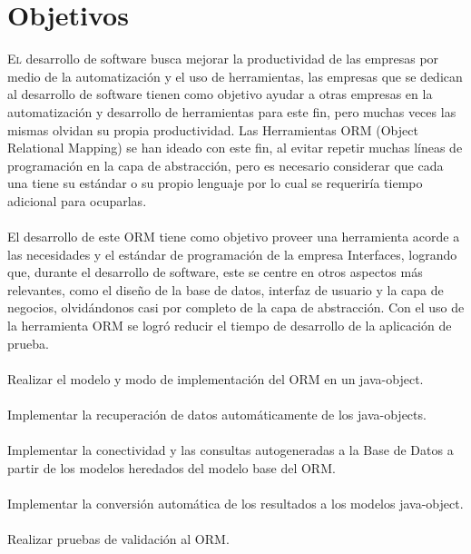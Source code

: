 \documentclass[twoside,twocolumn]{article}
\begin{document}
\section{Objetivos}
\begin{flushright}
\begin{itemize}
\lettrine[nindent=0em,lines=3]{E}l desarrollo de software busca mejorar la productividad de las empresas por medio de la automatización y el uso de herramientas, las empresas que se dedican al desarrollo de software tienen como objetivo ayudar a otras empresas en la automatización y desarrollo de herramientas para este fin, pero muchas veces las mismas olvidan su propia productividad. Las Herramientas ORM (Object  Relational  Mapping) se han ideado con este fin, al evitar repetir muchas líneas de programación en la capa de abstracción, pero es necesario considerar que cada una tiene su estándar o su propio lenguaje por lo cual se requeriría tiempo adicional para ocuparlas. \textbf{}\\
\textbf{}\\
El desarrollo de este ORM tiene como objetivo proveer una herramienta acorde a las necesidades y el estándar de programación de la empresa Interfaces, logrando que, durante el desarrollo de software, este se centre en otros aspectos más relevantes, como el diseño de la base de datos, interfaz de usuario y la capa de negocios, olvidándonos casi por completo de la capa de abstracción. Con el uso de la herramienta ORM se logró reducir el tiempo de desarrollo de la aplicación de prueba.\textbf{}\\
\textbf{}\\
Realizar el modelo y modo de implementación del ORM en un java-object. \textbf{}\\
\textbf{}\\
Implementar la recuperación de datos automáticamente de los java-objects.\textbf{}\\
\textbf{}\\
Implementar la conectividad y las consultas autogeneradas a la Base de Datos a partir de los modelos heredados del modelo base del ORM.\textbf{}\\
\textbf{}\\
Implementar la conversión automática de los resultados a los modelos java-object.\textbf{}\\
\textbf{}\\
Realizar pruebas de validación al ORM. 




\end{itemize}
\end{flushright}
\end{document}
